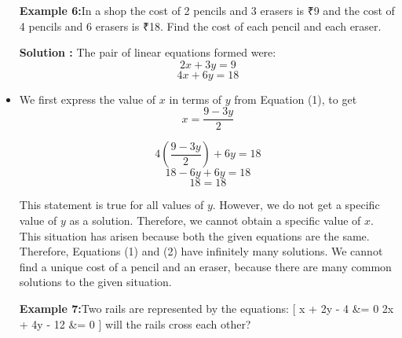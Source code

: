 \documentclass[a4paper,10pt]{article}
\begin{document}
  \begin{itemize}
\textbf{\textcolor{cyanblue}{Example 6:}}In a shop the cost of 2 pencils and 3 erasers is ₹9 and the cost of 4 pencils and 6 erasers is ₹18. Find the cost of each pencil and each eraser.

\textbf{\textcolor{cyanblue}{Solution :}} The pair of linear equations formed were:
\begin{equation}
2x + 3y = 9 \tag{1}
\end{equation}
\begin{equation}
4x + 6y = 18 \tag{2}
\end{equation}
\item We first express the value of \( x \) in terms of \( y \) from Equation (1), to get
\begin{equation}
x = \frac{9 - 3y}{2} \tag{3}
\end{equation}
\begin{enumerate}
    \begin{equation}
    4 \left( \frac{9 - 3y}{2} \right) + 6y = 18 \tag{4}
    \end{equation}
    \begin{equation}
    18 - 6y + 6y = 18 \tag{5}
    \end{equation}
    \begin{equation}
    18 = 18 \tag{6}
    \end{equation}
\end{enumerate}
This statement is true for all values of \( y \). However, we do not get a specific value of \( y \) as a solution. Therefore, we cannot obtain a specific value of \( x \). This situation has arisen because both the given equations are the same. 
Therefore, Equations (1) and (2) have infinitely many solutions. We cannot find a unique cost of a pencil and an eraser, because there are many common solutions to the given situation.

\noindent
\textbf{\textcolor{cyanblue}{Example 7:}}Two rails are represented by the equations:
[
x + 2y - 4 &= 0 \quad {} \quad 2x + 4y - 12 &= 0 
]
will the rails cross each other?


\end{itemize}
\end{document}
